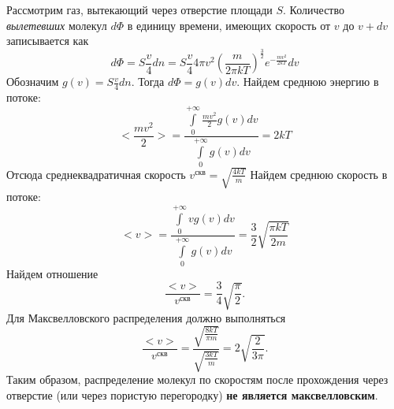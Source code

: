 \documentclass[a4paper]{article}
\title{}
\author{С.~Е.~Володин, 272 гр.}
\date{}
\begin{document}
\maketitle
Рассмотрим газ, вытекающий через отверстие площади $S$. Количество {\em вылетевших} молекул $d\Phi$ в единицу времени, имеющих скорость от $v$ до $v+dv$ записывается как
$$
d\Phi=S\frac{v}{4}dn=S\frac{v}{4}4\pi v^2 \left(\frac{m}{2\pi k T}\right)^\frac{3}{2}e^{-\frac{mv^2}{2 k T}}dv
$$
Обозначим $g(v)=S\frac{v}{4}dn$. Тогда $d\Phi=g(v)dv.$\newline
Найдем среднюю энергию в потоке:
$$
<\frac{mv^2}{2}>=\frac{\int\limits_{0}^{+\infty} \frac{mv^2}{2}g(v)dv}{\int\limits_{0}^{+\infty} g(v)dv}=2kT
$$
Отсюда среднеквадратичная скорость $v^{\text{скв}}=\sqrt{\frac{4kT}{m}}$\newline
Найдем среднюю скорость в потоке:
$$
<v>=\frac{\int\limits_{0}^{+\infty} vg(v)dv}{\int\limits_{0}^{+\infty} g(v)dv}=\frac{3}{2}\sqrt{\frac{\pi k T}{2 m}}
$$
Найдем отношение
$$
\frac{<v>}{v^{\text{скв}}}=\frac{3}{4}\sqrt{\frac{\pi}{2}}.
$$
Для Максвелловского распределения должно выполняться
$$
\frac{<v>}{v^{\text{скв}}}=\frac{\sqrt{\frac{8kT}{\pi m}}}{\sqrt{\frac{3kT}{m}}}=2\sqrt{\frac{2}{3 \pi}}.
$$
Таким образом, распределение молекул по скоростям после прохождения через отверстие (или через пористую перегородку) \textbf{не является максвелловским}.
\end{document}
